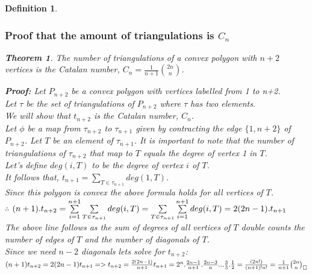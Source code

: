 \documentclass[12pt]{article}
\newtheorem{definition}{Definition}
\newtheorem{theorem}{Theorem}
\begin{document}
\begin{definition}
\subsubsection{Proof that the amount of triangulations is $C_n$}
\begin{theorem}
The number of triangulations of a convex polygon with $n+2$ vertices is the Catalan number, $C_n = \frac{1}{n+1} \binom{2n}{n}$. \cite{DiscMathsRosen}
\end{theorem}
{\bf Proof:} Let $P_{n+2}$ be a convex polygon with vertices labelled from 1 to n+2.\\
Let $\tau$ be the set of triangulations of $P_{n+2}$ where $\tau$ has two elements.\\
We will show that $t_{n+2}$ is the Catalan number, $C_n$.\\
Let $\phi$ be a map from $\tau_{n+2}$ to $\tau_{n+1}$ given by contracting the edge $\{1, n+2\}$ of $P_{n+2}$.
Let $T$ be an element of $\tau_{n+1}$. It is important to note that the number of triangulations of $\tau_{n+2}$ that map to $T$ equals the degree of vertex 1 in $T$.\\
Let's define $deg(i, T)$ to be the degree of vertex $i$ of $T$.\\
It follows that, $t_{n+1} = \sum\limits_{T\in\tau_{n+1}} deg(1, T)$.\\
Since this polygon is convex the above formula holds for all vertices of $T$.\\
$\therefore$ $(n+1).t_{n+2} = \sum\limits_{i=1}^{n+1} \sum\limits_{T\in\tau_{n+1}} deg(i, T)\\
                            = \sum\limits_{T\in\tau_{n+1}} \sum\limits_{i=1}^{n+1} deg(i, T)\\
                            = 2(2n-1).t_{n+1}$\\
The above line follows as the sum of degrees of all vertices of $T$ double counts the number of edges of $T$ and the number of diagonals of $T$.\\
Since we need $n-2$ diagonals lets solve for $t_{n+2}$:\\
$(n+1)t_{n+2} = 2(2n-1)t_{n+1}\\
=>t_{n+2} = \frac{2(2n-1)}{n+1} t_{n+1} = 2^n.\frac{2n-1}{n+1}.\frac{2n-3}{n} ... \frac{3}{3}.\frac{1}{2}\\
=\frac{(2n!)}{(n+1)!n!}\\
=\frac{1}{n+1} \binom{2n}{n}_\square$


\end{definition}
\end{document}
